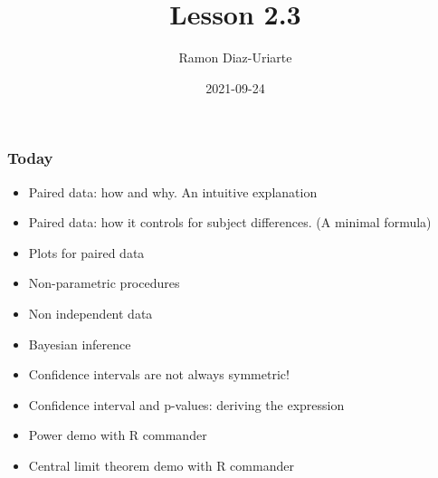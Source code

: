 \documentclass[bigger]{beamer}
\author{Ramon Diaz-Uriarte}
\date{2021-09-24}
\title{Lesson 2.3}
\begin{document}



\begin{frame}
  \frametitle{Today}
  \begin{itemize}
  \item Paired data: how and why. An intuitive explanation
  \item Paired data: how it controls for subject differences. (A minimal formula)
  \item Plots for paired data
  \item Non-parametric procedures
  \item Non independent data
  \item Bayesian inference
  \item Confidence intervals are not always symmetric!
  \item Confidence interval and p-values: deriving the expression
  \item Power demo with R commander
  \item Central limit theorem demo with R commander
  \end{itemize}
\end{frame}
\end{document}
